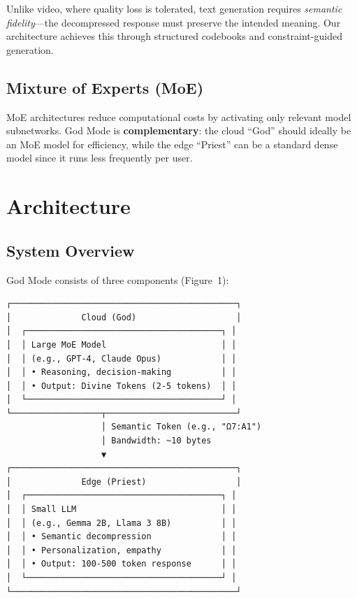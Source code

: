 \documentclass{article}
\begin{document}
Unlike video, where quality loss is tolerated, text generation requires \textit{semantic fidelity}---the decompressed response must preserve the intended meaning. Our architecture achieves this through structured codebooks and constraint-guided generation.

\subsection{Mixture of Experts (MoE)}

MoE architectures \cite{fedus2022,jiang2024mixtral} reduce computational costs by activating only relevant model subnetworks. God Mode is \textbf{complementary}: the cloud ``God'' should ideally be an MoE model for efficiency, while the edge ``Priest'' can be a standard dense model since it runs less frequently per user.

\section{Architecture}

\subsection{System Overview}

God Mode consists of three components (Figure~1):

\begin{verbatim}
┌─────────────────────────────────────────────┐
│              Cloud (God)                    │
│  ┌───────────────────────────────────────┐ │
│  │ Large MoE Model                       │ │
│  │ (e.g., GPT-4, Claude Opus)            │ │
│  │ • Reasoning, decision-making          │ │
│  │ • Output: Divine Tokens (2-5 tokens)  │ │
│  └───────────────────────────────────────┘ │
└──────────────────┬──────────────────────────┘
                   │ Semantic Token (e.g., "Ω7:A1")
                   │ Bandwidth: ~10 bytes
                   ▼
┌─────────────────────────────────────────────┐
│              Edge (Priest)                  │
│  ┌───────────────────────────────────────┐ │
│  │ Small LLM                             │ │
│  │ (e.g., Gemma 2B, Llama 3 8B)          │ │
│  │ • Semantic decompression              │ │
│  │ • Personalization, empathy            │ │
│  │ • Output: 100-500 token response      │ │
│  └───────────────────────────────────────┘ │
└─────────────────────────────────────────────┘
\end{verbatim}
\end{document}
